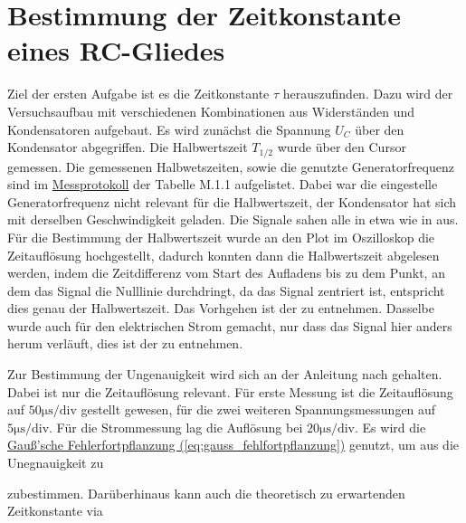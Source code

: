 \section{Bestimmung der Zeitkonstante eines RC-Gliedes}
\label{sec:A1}
Ziel der ersten Aufgabe ist es die Zeitkonstante $\tau$  herauszufinden. Dazu wird der Versuchsaufbau mit verschiedenen Kombinationen aus Widerständen und Kondensatoren aufgebaut. Es wird zunächst die Spannung $U_C$ über den Kondensator abgegriffen. Die Halbwertszeit $T_{1/2}$ wurde über den Cursor gemessen. Die gemessenen Halbwetszeiten, sowie die genutzte Generatorfrequenz sind im \hyperref[ch:Protokoll]{Messprotokoll} der Tabelle M.1.1 aufgelistet.
Dabei war die eingestelle Generatorfrequenz nicht relevant für die Halbwertszeit, der Kondensator hat sich mit derselben Geschwindigkeit geladen. Die Signale sahen alle in etwa wie in  aus. 
Für die Bestimmung der Halbwertszeit wurde an den Plot im Oszilloskop die Zeitauflösung hochgestellt, dadurch konnten dann die Halbwertszeit abgelesen werden, indem die Zeitdifferenz vom Start des Aufladens bis zu dem Punkt, an dem das Signal die Nulllinie durchdringt, da das Signal zentriert ist, entspricht dies genau der Halbwertszeit. Das Vorhgehen ist der  zu entnehmen. Dasselbe wurde auch für den elektrischen Strom gemacht, nur dass das Signal hier anders herum verläuft, dies ist der  zu entnehmen.




Zur Bestimmung der Ungenauigkeit wird sich an der Anleitung nach  gehalten. Dabei ist nur die Zeitauflösung relevant. Für erste Messung ist die Zeitauflösung auf $50 \mathrm{\mu s/div}$ gestellt gewesen, für die zwei weiteren Spannungsmessungen auf $5 \mathrm{\mu s/div}$. Für die Strommessung lag die Auflösung bei $20 \mathrm{\mu s/div}$.
Es wird die \hyperref[eq:gauss_fehlfortpflanzung]{Gauß'sche Fehlerfortpflanzung (\ref*{eq:gauss_fehlfortpflanzung})} genutzt, um aus  die Unegnauigkeit zu


zubestimmen. Darüberhinaus kann auch die theoretisch zu erwartenden Zeitkonstante via

